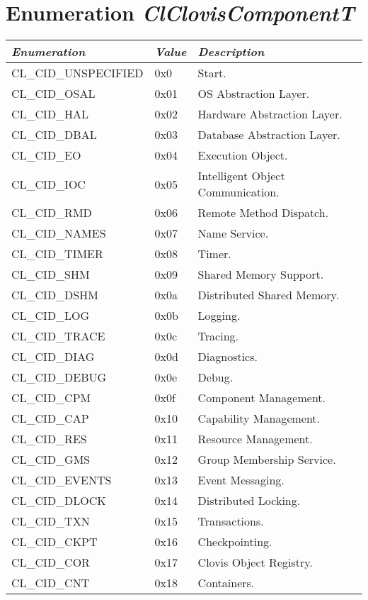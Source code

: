 \newpage
\section{Enumeration \textit{ClClovisComponentT}}
\begin{tabular}{|p{2in}|p{1in}|p{2in}|} \hline
\textbf{\textit{Enumeration}} &\textbf{\textit{Value}} &\textbf{\textit{Description}} \\\hline
CL\_\-CID\_\-UNSPECIFIED &0x0 &Start.\\
CL\_\-CID\_\-OSAL &0x01 &OS Abstraction Layer.\\
CL\_\-CID\_\-HAL &0x02 &Hardware Abstraction Layer.\\
CL\_\-CID\_\-DBAL &0x03 &Database Abstraction Layer.\\
CL\_\-CID\_\-EO &0x04 &Execution Object.\\
CL\_\-CID\_\-IOC &0x05 &Intelligent Object Communication.\\
CL\_\-CID\_\-RMD &0x06 &Remote Method Dispatch.\\
CL\_\-CID\_\-NAMES &0x07 &Name Service.\\
CL\_\-CID\_\-TIMER &0x08 &Timer.\\
CL\_\-CID\_\-SHM &0x09 &Shared Memory Support.\\
CL\_\-CID\_\-DSHM &0x0a &Distributed Shared Memory.\\
CL\_\-CID\_\-LOG &0x0b &Logging.\\
CL\_\-CID\_\-TRACE &0x0c &Tracing.\\
CL\_\-CID\_\-DIAG &0x0d &Diagnostics.\\
CL\_\-CID\_\-DEBUG &0x0e &Debug.\\
CL\_\-CID\_\-CPM &0x0f &Component Management.\\
CL\_\-CID\_\-CAP &0x10 &Capability Management.\\
CL\_\-CID\_\-RES &0x11 &Resource Management.\\
CL\_\-CID\_\-GMS &0x12 &Group Membership Service.\\
CL\_\-CID\_\-EVENTS &0x13 &Event Messaging.\\
CL\_\-CID\_\-DLOCK &0x14 &Distributed Locking.\\
CL\_\-CID\_\-TXN &0x15 &Transactions.\\
CL\_\-CID\_\-CKPT &0x16 &Checkpointing.\\
CL\_\-CID\_\-COR &0x17 &Clovis Object Registry.\\
CL\_\-CID\_\-CNT &0x18 &Containers.\\

\end{tabular}
